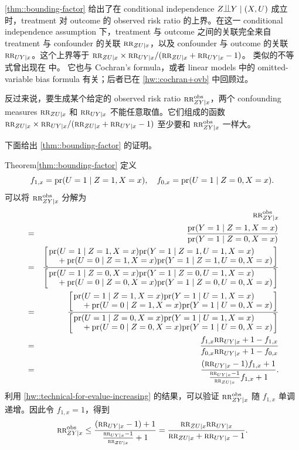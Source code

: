 \cref{thm::bounding-factor} 给出了在 conditional independence $Z\ind Y\mid (X, U)$ 成立时，treatment 对 outcome 的 observed risk ratio 的上界。在这一 conditional independence assumption 下，treatment 与 outcome 之间的关联完全来自 treatment 与 confounder 的关联 $\textsc{rr}_{ZU\mid x} $，以及 confounder 与 outcome 的关联 $\textsc{rr}_{UY\mid x}$。这个上界等于 $\textsc{rr}_{ZU\mid x} \times  \textsc{rr}_{UY\mid x} /  (\textsc{rr}_{ZU\mid x} + \textsc{rr}_{UY\mid x} - 1)$。
类似的不等式曾出现在 \citet{lee2011bounding} 中。
它也与 Cochran's formula，或者 linear models 中的 omitted-variable bias formula 有关；后者已在 \cref{hw::cochran+ovb} 中回顾过。



反过来说，要生成某个给定的 observed risk ratio $\textsc{rr}_{ZY\mid x}^{\textup{obs}}$，两个 confounding measures $\textsc{rr}_{ZU\mid x} $ 和 $\textsc{rr}_{UY\mid x}$ 不能任意取值。它们组成的函数 $\textsc{rr}_{ZU\mid x}  \times  \textsc{rr}_{UY\mid x} /  (\textsc{rr}_{ZU\mid x} + \textsc{rr}_{UY\mid x} - 1)$ 至少要和 $\textsc{rr}_{ZY\mid x}^{\textup{obs}}$ 一样大。

下面给出 \cref{thm::bounding-factor} 的证明。


\begin{myproof}{Theorem}{\cref{thm::bounding-factor}}
定义
$$ 
f_{1,x} = \textup{pr}(U=1\mid Z=1,X=x),\quad
f_{0,x}  = \textup{pr}(U=1\mid Z=0,X=x) .
$$ 
可以将 $\textsc{rr}_{ZY\mid x}^{\textup{obs}}$ 分解为
\begin{eqnarray*}
&&\RR_{ZY\mid x}^\obs  \\
&=& \frac{  \pr( Y  = 1\mid Z=1, X=x  ) }{ \pr( Y  = 1\mid  Z=0,  X=x  ) } \\
&=& \frac{ \left[ \splitfrac{ \pr(U=1\mid Z=1,  X=x) \pr( Y  = 1\mid Z=1, U=1,  X=x  ) }{+ \pr(U=0\mid Z=1,  X=x) \pr( Y  = 1\mid Z=1, U=0,  X=x  )} \right]}
{ \left[ \splitfrac{\pr(U=1\mid Z=0,  X=x) \pr( Y  = 1\mid  Z=0, U=1,  X=x  )}{  +  \pr(U=0\mid Z=0,  X=x) \pr( Y  = 1\mid  Z=0, U=0,  X=x  ) } \right]  } \\
&=& \frac{ \left[ \splitfrac{ \pr(U=1\mid Z=1,  X=x) \pr( Y  = 1\mid U=1,  X=x  ) }{+ \pr(U=0\mid Z=1,  X=x) \pr( Y  = 1\mid U=0,  X=x  )}\right] }
{  \left[ \splitfrac{ \pr(U=1\mid Z=0,  X=x) \pr( Y  = 1\mid   U=1,  X=x  )  }{+  \pr(U=0\mid Z=0,  X=x) \pr( Y  = 1\mid  U=0,  X=x  ) }\right]  } \\
&=& \frac{  f_{1,x} \RR_{UY\mid x} + 1- f_{1,x}  }{ f_{0,x} \RR_{UY\mid x} + 1- f_{0,x}  } \\
&=& \frac{  (\RR_{UY\mid x} - 1) f_{1,x} + 1  }{      \frac{  \RR_{UY\mid x} - 1}{  \RR_{ZU\mid x} }    f_{1,x} + 1  } .
\end{eqnarray*}
利用 \cref{hw::technical-for-evalue-increasing} 的结果，可以验证 $\textsc{rr}_{ZY\mid x}^{\textup{obs}}$ 随 $f_{1,x} $ 单调递增。因此令 $f_{1,x} = 1$，得到
$$
\textsc{rr}_{ZY\mid x}^{\textup{obs}} \leq \frac{  (\textsc{rr}_{UY\mid x} - 1) + 1  }{      \frac{  \textsc{rr}_{UY\mid x} - 1}{  \textsc{rr}_{ZU\mid x} }    + 1  }
= \frac{ \textsc{rr}_{ZU\mid x}  \textsc{rr}_{UY\mid x} }{  \textsc{rr}_{ZU\mid x} + \textsc{rr}_{UY\mid x} - 1} .
$$
\end{myproof}

